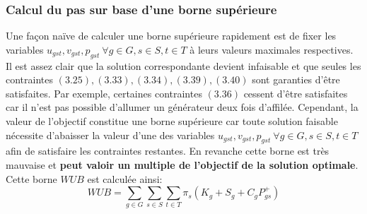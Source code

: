 \subsubsection{Calcul du pas sur base d'une borne supérieure}

Une façon naïve de calculer une borne supérieure rapidement est de fixer les variables
$u_{gst}, v_{gst}, p_{gst} \ \forall g \in G, s \in S, t \in T$ à leurs valeurs maximales respectives.
Il est assez clair que la solution correspondante devient infaisable et que seules les contraintes 
$(3.25), (3.33), (3.34), (3.39), (3.40)$ sont garanties d'être satisfaites. Par exemple, certaines contraintes $(3.36)$ cessent d'être satisfaites
car il n'est pas possible d'allumer un générateur deux fois d'affilée. Cependant, la valeur de l'objectif constitue une borne supérieure
car toute solution faisable nécessite d'abaisser la valeur d'une des variables $u_{gst}, v_{gst}, p_{gst} \ \forall g \in G, s \in S, t \in T$
afin de satisfaire les contraintes restantes. En revanche cette borne est très mauvaise et \textbf{peut valoir un multiple de l'objectif de la solution optimale}.
Cette borne $WUB$ est calculée ainsi:
\begin{equation}
    WUB = \sum\limits_{g \in G} \sum\limits_{s \in S} \sum\limits_{t \in T} \pi_s (K_g + S_g + C_g P_{gs}^{+})
\end{equation}

